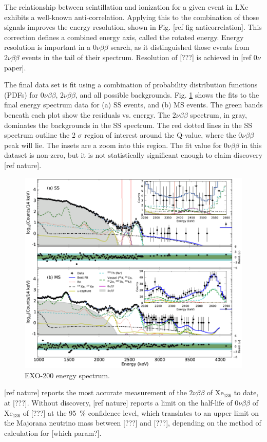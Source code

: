 The relationship between scintillation and ionization for a given event in LXe exhibits a well-known anti-correlation.  Applying this to the combination of those signals improves the energy resolution, shown in Fig. [ref fig anticorrelation].  This correction defines a combined energy axis, called the rotated energy.  Energy resolution is important in a $0\nu\beta\beta$ search, as it distinguished those events from $2\nu\beta\beta$ events in the tail of their spectrum.  Resolution of [???] is achieved in [ref $0\nu$ paper].

The final data set is fit using a combination of probability distribution functions (PDFs) for $0\nu\beta\beta$, $2\nu\beta\beta$, and all possible backgrounds.  Fig. \ref{fig:exo200data} shows the fits to the final energy spectrum data for (a) SS events, and (b) MS events.  The green bands beneath each plot show the residuals vs. energy.  The $2\nu\beta\beta$ spectrum, in gray, dominates the backgrounds in the SS spectrum.  The red dotted lines in the SS spectrum outline the {\color{red}2} $\sigma$ region of interest around the Q-value, where the $0\nu\beta\beta$ peak will lie.  The insets are a zoom into this region.  The fit value for $0\nu\beta\beta$ in this dataset is non-zero, but it is not statistically significant enough to claim discovery [ref nature].

\begin{figure}[H]
	\centering
	\includegraphics[width=.7\textwidth]{figures/exo_200_results.png}
	\caption{EXO-200 energy spectrum.  }
\label{fig:exo200data}
\end{figure}

[ref nature] reports the most accurate measurement of the $2\nu\beta\beta$ of Xe$_{136}$ to date, at [???].  Without discovery, [ref nature] reports a limit on the half-life of $0\nu\beta\beta$ of Xe$_{136}$ of [???] at the {\color{red}95~\%} confidence level, which translates to an upper limit on the Majorana neutrino mass between [???] and [???], depending on the method of calculation for [which param?].

